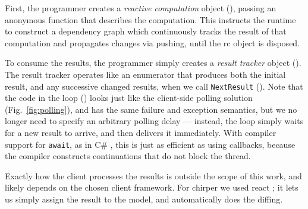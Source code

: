 First, the programmer creates a \emph{reactive computation} object (), passing an anonymous function that describes the computation. This instructs the runtime to construct a dependency graph which continuously tracks the result of that computation and propagates changes via pushing, until the rc object is disposed.

To consume the results, the programmer simply creates a \emph{result tracker} object (). The result tracker operates like an enumerator that produces both the initial result, and any successive changed results, when we call \lstinline|NextResult| (). %
Note that the code in the loop () looks just like the client-side polling solution (Fig.~\ref{fig:polling}), and has the same failure and exception semantics, but we no longer need to specify an arbitrary polling delay --- instead, the loop simply waits for a new result to arrive, and then delivers it immediately. With compiler support for \lstinline|await|, as in C\# \cite{Bierman2012}, this is just as efficient as using callbacks, because the compiler constructs continuations that do not block the thread.

Exactly how the client processes the results is outside the scope of this work, and likely depends on the chosen client framework. For chirper  we used react \cite{react}; it lets us simply assign the result to the model, and automatically does the diffing.


 
